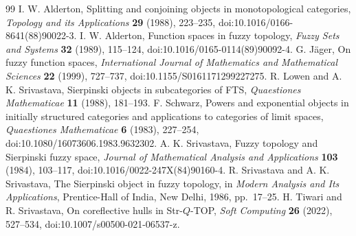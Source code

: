 \documentclass[10pt,a4paper]{amsart}
\numberwithin{equation}{section}
\begin{document}
\begin{thebibliography}{99}
 I. W. Alderton, Splitting and conjoining objects in monotopological categories, \emph{Topology and its Applications} \textbf{29} (1988), 223--235, doi:10.1016/0166-8641(88)90022-3.
 I. W. Alderton, Function spaces in fuzzy topology, \emph{Fuzzy Sets and Systems} \textbf{32} (1989), 115--124, doi:10.1016/0165-0114(89)90092-4.
 G. J\"ager, On fuzzy function spaces, \emph{International Journal of Mathematics and Mathematical Sciences} \textbf{22} (1999), 727--737, doi:10.1155/S0161171299227275.
 R. Lowen and A. K. Srivastava, Sierpinski objects in subcategories of FTS, \emph{Quaestiones Mathematicae} \textbf{11} (1988), 181--193.
 F. Schwarz, Powers and exponential objects in initially structured categories and applications to categories of limit spaces, \emph{Quaestiones Mathematicae} \textbf{6} (1983), 227--254, doi:10.1080/16073606.1983.9632302.
 A. K. Srivastava, Fuzzy topology and Sierpinski fuzzy space, \emph{Journal of Mathematical Analysis and Applications} \textbf{103} (1984), 103--117, doi:10.1016/0022-247X(84)90160-4.
 R. Srivastava and A. K. Srivastava, The Sierpinski object in fuzzy topology, in \emph{Modern Analysis and Its Applications}, Prentice-Hall of India, New Delhi, 1986, pp.~17--25.
 H. Tiwari and R. Srivastava, On coreflective hulls in Str-\(Q\)-TOP, \emph{Soft Computing} \textbf{26} (2022), 527--534, doi:10.1007/s00500-021-06537-z.
\end{thebibliography}
\end{document}
